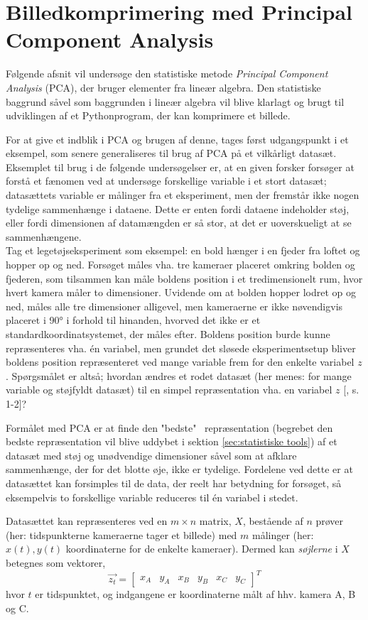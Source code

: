\chapter{Billedkomprimering med Principal Component Analysis}
Følgende afsnit vil undersøge den statistiske metode \emph{Principal Component Analysis} (PCA), der bruger elementer fra lineær algebra. Den statistiske baggrund såvel som baggrunden i lineær algebra vil blive klarlagt og brugt til udviklingen af et Pythonprogram, der kan komprimere et billede.

For at give et indblik i PCA og brugen af denne, tages først udgangspunkt i et eksempel, som senere generaliseres til brug af PCA på et vilkårligt datasæt. Eksemplet til brug i de følgende undersøgelser er, at en given forsker forsøger at forstå et fænomen ved at undersøge forskellige variable i et stort datasæt; datasættets variable er målinger fra et eksperiment, men der fremstår ikke nogen tydelige sammenhænge i dataene. Dette er enten fordi dataene indeholder støj, eller fordi dimensionen af datamængden er så stor, at det er uoverskueligt at se sammenhængene. \\
Tag et legetøjseksperiment som eksempel: en bold hænger i en fjeder fra loftet og hopper op og ned. Forsøget måles vha. tre kameraer placeret omkring bolden og fjederen, som tilsammen kan måle boldens position i et tredimensionelt rum, hvor hvert kamera måler to dimensioner. Uvidende om at bolden hopper lodret op og ned, måles alle tre dimensioner alligevel, men kameraerne er ikke nøvendigvis placeret i 90° i forhold til hinanden, hvorved det ikke er et standardkoordinatsystemet, der måles efter. Boldens position burde kunne repræsenteres vha. én variabel, men grundet det sløsede eksperimentsetup bliver boldens position repræsenteret ved mange variable frem for den enkelte variabel $z$. Spørgsmålet er altså; hvordan ændres et rodet datasæt (her menes: for mange variable og støjfyldt datasæt) til en simpel repræsentation vha. en variabel $z$ [\citet{PCA_slens}, s. 1-2]?

Formålet med PCA er at finde den "bedste" \ repræsentation (begrebet den bedste repræsentation vil blive uddybet i sektion \ref{sec:statistiske tools}) af et datasæt med støj og unødvendige dimensioner såvel som at afklare sammenhænge, der for det blotte øje, ikke er tydelige. Fordelene ved dette er at datasættet kan forsimples til de data, der reelt har betydning for forsøget, så eksempelvis to forskellige variable reduceres til én variabel i stedet.

Datasættet kan repræsenteres ved en $m \times n$ matrix, $X$, bestående af $n$ prøver (her: tidspunkterne kameraerne tager et billede) med $m$ målinger (her: $x(t), y(t)$ koordinaterne for de enkelte kameraer). Dermed kan \emph{søjlerne} i $X$ betegnes som vektorer, $$ \vec{z_t}=\begin{bmatrix} x_{A} & y_{A} & x_{B} & y_{B} & x_{C} & y_{C} \end{bmatrix}^T $$ hvor $t$ er tidspunktet, og indgangene er koordinaterne målt af hhv. kamera A, B og C.

